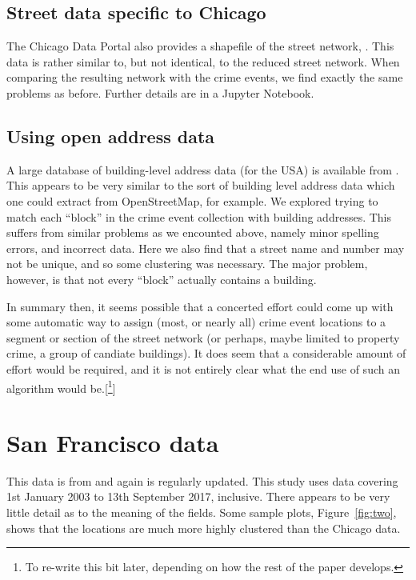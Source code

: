 \documentclass[twoside,a4paper,twocolumn,10pt]{article}
\theoremstyle{plain}
\theoremstyle{definition}
\begin{document}
\subsection{Street data specific to Chicago}

The Chicago Data Portal also provides a shapefile of the street network, \cite{cstreets}.
This data is rather similar to, but not identical, to the reduced street network.
When comparing the resulting network with the crime events, we find exactly the same
problems as before.  Further details are in a Jupyter Notebook.

\subsection{Using open address data}

A large database of building-level address data (for the USA) is available from
\cite{oa}.  This appears to be very similar to the sort of building level address
data which one could extract from OpenStreetMap, for example.  We explored trying to
match each ``block'' in the crime event collection with building addresses.  This
suffers from similar problems as we encounted above, namely minor spelling errors,
and incorrect data.  Here we also find that a street name and number may not be
unique, and so some clustering was necessary.  The major problem, however, is that
not every ``block'' actually contains a building.

In summary then, it seems possible that a concerted effort could come up with some
automatic way to assign (most, or nearly all) crime event locations to a segment or
section of the street network (or perhaps, maybe limited to property crime, a group
of candiate buildings).  It does seem that a considerable amount of effort
would be required, and it is not entirely clear what the end use of such an algorithm
would be.[\footnote{To re-write this bit later, depending on how the rest of the
paper develops.}]




\section{San Francisco data}

This data is from \cite{sfdata} and again is regularly updated.  This study uses data
covering 1st January 2003 to 13th September 2017, inclusive.
There appears to be very
little detail as to the meaning of the fields.  Some sample plots, Figure~\ref{fig:two},
shows that the locations are much more highly clustered than the Chicago data.
\end{document}
